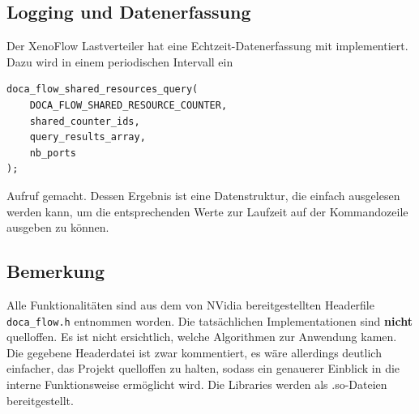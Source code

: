 \subsection{Logging und Datenerfassung}
Der XenoFlow Lastverteiler hat eine Echtzeit-Datenerfassung mit implementiert. Dazu wird in einem periodischen Intervall ein 
\begin{verbatim}
doca_flow_shared_resources_query(
    DOCA_FLOW_SHARED_RESOURCE_COUNTER,
    shared_counter_ids,
    query_results_array,
    nb_ports
);
\end{verbatim}
Aufruf gemacht. Dessen Ergebnis ist eine Datenstruktur, die einfach ausgelesen werden kann, um die entsprechenden Werte zur Laufzeit auf der Kommandozeile ausgeben zu können.

\subsection{Bemerkung}
Alle Funktionalitäten sind aus dem von NVidia bereitgestellten Headerfile\texttt{ doca\_flow.h} entnommen worden. Die tatsächlichen Implementationen sind \textbf{nicht} quelloffen. Es ist nicht ersichtlich, welche Algorithmen zur Anwendung kamen. Die gegebene Headerdatei ist zwar kommentiert, es wäre allerdings deutlich einfacher, das Projekt quelloffen zu halten, sodass ein genauerer Einblick in die interne Funktionsweise ermöglicht wird. Die Libraries werden als .so-Dateien bereitgestellt.
